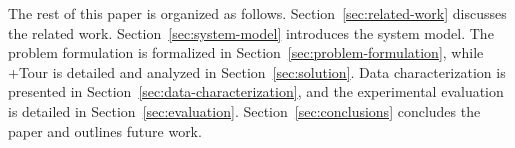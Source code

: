 The rest of this paper is organized as follows. Section~\ref{sec:related-work} discusses the related work. Section~\ref{sec:system-model} introduces the system model. The problem formulation is formalized in Section~\ref{sec:problem-formulation}, while +Tour is detailed {and analyzed} in Section~\ref{sec:solution}. Data characterization is presented in Section~\ref{sec:data-characterization}, and the experimental evaluation is detailed in Section~\ref{sec:evaluation}. Section~\ref{sec:conclusions} concludes the paper and outlines future work.